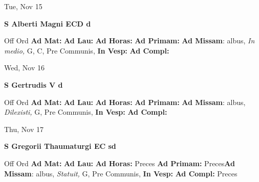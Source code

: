 \documentclass[10pt]{book}
\begin{document}
\begin{center}
\begin{minipage}{3.5in}
\vspace{2em}
\begin{center}Tue, Nov 15
\end{center}
\textbf{ \large S Alberti Magni ECD
\textnormal{\normalsize d}}

\begin{justify}Off Ord
\textbf{Ad Mat: }
\textbf{Ad Lau: }
\textbf{Ad Horas: }
\textbf{Ad Primam: }\textbf{Ad Missam}: albus, \textit{In medio,} G, C, Pre Communis, 
\textbf{In Vesp: }
\textbf{Ad Compl: }
\end{justify}
\end{minipage}
\end{center}

\begin{center}
\begin{minipage}{3.5in}
\vspace{2em}
\begin{center}Wed, Nov 16
\end{center}
\textbf{ \large S Gertrudis V
\textnormal{\normalsize d}}

\begin{justify}Off Ord
\textbf{Ad Mat: }
\textbf{Ad Lau: }
\textbf{Ad Horas: }
\textbf{Ad Primam: }\textbf{Ad Missam}: albus, \textit{Dilexisti,} G, Pre Communis, 
\textbf{In Vesp: }
\textbf{Ad Compl: }
\end{justify}
\end{minipage}
\end{center}

\begin{center}
\begin{minipage}{3.5in}
\vspace{2em}
\begin{center}Thu, Nov 17
\end{center}
\textbf{ \large S Gregorii Thaumaturgi EC
\textnormal{\normalsize sd}}

\begin{justify}Off Ord
\textbf{Ad Mat: }
\textbf{Ad Lau: }
\textbf{Ad Horas: }Preces
\textbf{Ad Primam: }Preces\textbf{Ad Missam}: albus, \textit{Statuit,} G, Pre Communis, 
\textbf{In Vesp: }
\textbf{Ad Compl: }Preces
\end{justify}
\end{minipage}
\end{center}
\end{document}
